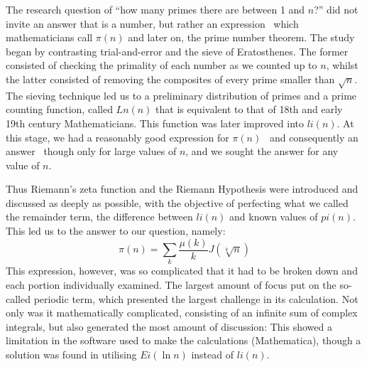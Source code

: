The research question of ``how many primes there are between 1 and $n$?'' did not invite an answer that is a number, but rather an expression \textendash\ which mathematicians call $\pi(n)$ and later on, the prime number theorem. The study began by contrasting trial-and-error and the sieve of Eratosthenes. The former consisted of checking the primality of each number as we counted up to $n$, whilst the latter consisted of removing the composites of every prime smaller than $\sqrt{n}$. The sieving technique led us to a preliminary distribution of primes and a prime counting function, called $Ln(n)$ that is equivalent to that of 18th and early 19th century Mathematicians. This function was later improved into $ li(n) $. At this stage, we had a reasonably good expression for $\pi(n)$ \textendash\ and consequently an answer \textendash\ though only for large values of $n$, and we sought the answer for any value of $n$.

Thus Riemann's zeta function and the Riemann Hypothesis were introduced and discussed as deeply as possible, with the objective of perfecting what we called the remainder term, the difference between $li(n)$ and known values of $pi(n)$. This led us to the answer to our question, namely:
\begin{equation*}
	\pi(n) = \sum_{k} \frac{\mu(k)}{k} J(\sqrt[k]{n})
\end{equation*}
This expression, however, was so complicated that it had to be broken down and each portion individually examined. The largest amount of focus put on the so-called periodic term, which presented the largest challenge in its calculation. Not only was it mathematically complicated, consisting of an infinite sum of complex integrals, but also generated the most amount of discussion: This showed a limitation in the software used to make the calculations (Mathematica), though a solution was found in utilising $Ei(\ln n)$ instead of $li(n)$.


